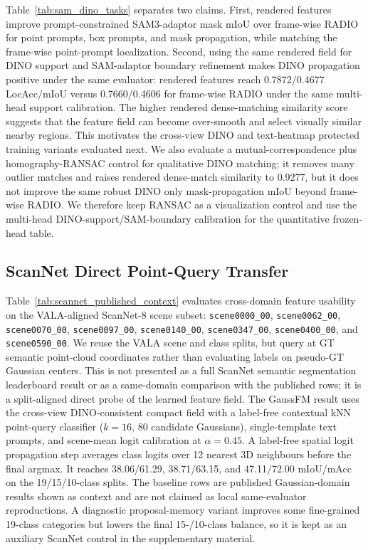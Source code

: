 \documentclass[journal,twoside]{IEEEtran}
\newcommand{\method}{GaussFM}
\begin{document}
Table~\ref{tab:sam_dino_tasks} separates two claims. First, rendered features
improve prompt-constrained SAM3-adaptor mask mIoU over frame-wise RADIO
for point prompts, box prompts, and mask propagation, while matching the
frame-wise point-prompt localization. Second, using the same rendered field for DINO
support and SAM-adaptor boundary refinement makes DINO propagation positive
under the same evaluator: rendered features reach 0.7872/0.4677
LocAcc/mIoU versus 0.7660/0.4606 for frame-wise RADIO under the same
multi-head support calibration. The higher rendered
dense-matching similarity score suggests that the feature field can become
over-smooth and select visually similar nearby regions. This motivates the
cross-view DINO and text-heatmap protected training variants evaluated next.
We also evaluate a mutual-correspondence plus homography-RANSAC control for
qualitative DINO matching; it removes many outlier matches and raises rendered
dense-match similarity to 0.9277, but it does not improve the same robust DINO
only mask-propagation mIoU beyond frame-wise RADIO. We therefore keep RANSAC as a
visualization control and use the multi-head DINO-support/SAM-boundary calibration
for the quantitative frozen-head table.

\subsection{ScanNet Direct Point-Query Transfer}



Table~\ref{tab:scannet_published_context} evaluates cross-domain feature
usability on the VALA-aligned ScanNet-8 scene subset:
\texttt{scene0000\_00}, \texttt{scene0062\_00}, \texttt{scene0070\_00},
\texttt{scene0097\_00}, \texttt{scene0140\_00}, \texttt{scene0347\_00},
\texttt{scene0400\_00}, and \texttt{scene0590\_00}. We reuse the VALA scene and
class splits, but query at GT semantic point-cloud coordinates rather than
evaluating labels on pseudo-GT Gaussian centers. This is not presented as a
full ScanNet semantic segmentation leaderboard result or as a same-domain
comparison with the published rows; it is a split-aligned direct probe of the
learned feature field. The \method{} result uses
the cross-view DINO-consistent compact field with a label-free contextual kNN
point-query classifier ($k=16$, 80 candidate Gaussians), single-template text prompts, and
scene-mean logit calibration at $\alpha=0.45$. A label-free spatial logit
propagation step averages class logits over 12 nearest 3D neighbours before the
final argmax. It reaches 38.06/61.29,
38.71/63.15, and 47.11/72.00 mIoU/mAcc on the 19/15/10-class splits. The
baseline rows are published Gaussian-domain results shown as context and are
not claimed as local same-evaluator reproductions.
A diagnostic proposal-memory variant improves some fine-grained
19-class categories but lowers the final 15-/10-class balance, so it is kept as
an auxiliary ScanNet control in the supplementary material.
\end{document}
